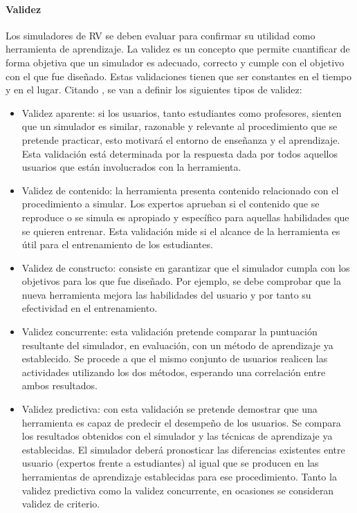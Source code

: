 \paragraph{Validez}

Los simuladores de \ac{RV} se deben evaluar para confirmar su utilidad como herramienta de aprendizaje. La validez es un concepto que permite cuantificar de forma objetiva que un simulador es adecuado, correcto y cumple con el objetivo con el que fue diseñado.
Estas validaciones tienen que ser constantes en el tiempo y en el lugar. Citando \cite{pales2010uso}, se van a definir los siguientes tipos de validez:
\begin{itemize}
    \item Validez aparente:
    si los usuarios, tanto estudiantes como profesores, sienten que un simulador es similar, razonable y relevante al procedimiento que se pretende practicar, esto motivará el entorno de enseñanza y el aprendizaje. Esta validación está determinada por la respuesta dada por todos aquellos usuarios que están involucrados con la herramienta.
    
    \item Validez de contenido: la herramienta presenta contenido relacionado con el procedimiento a simular. Los expertos aprueban si el contenido que se reproduce o se simula %
    es apropiado y específico para aquellas habilidades que se quieren entrenar.
    Esta validación mide si el alcance de la herramienta es útil para el entrenamiento de los estudiantes.
    
    \item Validez de constructo:
    consiste en garantizar que el simulador cumpla con los objetivos para los que fue diseñado. Por ejemplo, se debe comprobar que la nueva herramienta mejora las habilidades del usuario y por tanto su efectividad en el entrenamiento. 
    
    \item Validez concurrente:
    esta validación pretende comparar la puntuación resultante del simulador, en evaluación, con un método de aprendizaje ya establecido. Se procede a que el mismo conjunto de usuarios realicen las actividades utilizando los dos métodos, esperando una correlación entre ambos resultados.

    \item Validez predictiva:
    con esta validación se pretende demostrar que una herramienta es capaz de predecir el desempeño de los usuarios. Se compara los resultados obtenidos con el simulador y las técnicas de aprendizaje ya establecidas. El simulador deberá pronosticar las diferencias existentes entre usuario (expertos frente a estudiantes) al igual que se producen en las herramientas de aprendizaje establecidas para ese procedimiento.  Tanto la validez predictiva como la validez concurrente, en ocasiones se consideran validez de criterio. 
    

\end{itemize}
